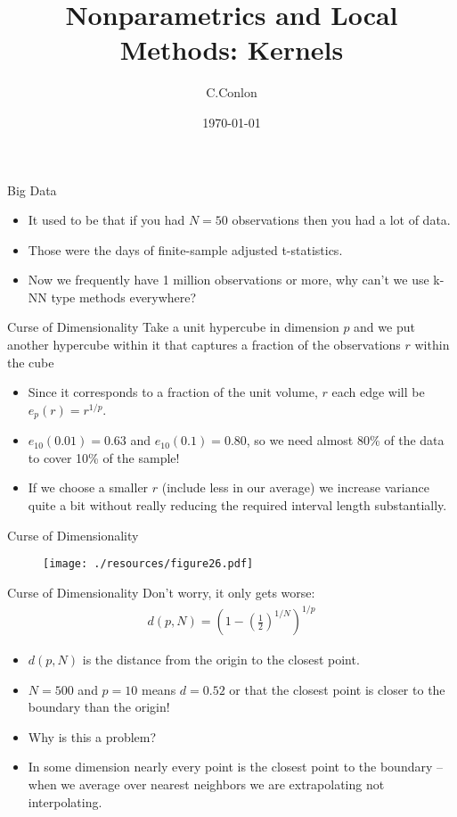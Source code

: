 \documentclass[11pt,handout,xcolor=pdftex,dvipsnames,table,mathserif,aspectratio=169]{beamer}
\title [Nonparametrics]{Nonparametrics and Local Methods: Kernels}
\author{C.Conlon}
\institute{Applied Econometrics}
\date{\today}
\begin{document}
\begin{frame}
\titlepage
\end{frame}



\begin{frame}{Big Data}
\begin{itemize}
\item It used to be that if you had $N=50$ observations then you had a lot of data.
\item Those were the days of finite-sample adjusted t-statistics.
\item Now we frequently have 1 million observations or more, why can't we use k-NN type methods everywhere?
\end{itemize}
\end{frame}

\begin{frame}{Curse of Dimensionality}
Take a unit hypercube in dimension $p$ and we put another hypercube within it that captures a fraction of the observations $r$ within the cube
\begin{itemize}
\item Since it corresponds to a fraction of the unit volume, $r$ each edge  will be $e_p(r) = r^{1/p}$.
\item $e_{10}(0.01) = 0.63$ and $e_{10}(0.1) = 0.80$, so we need almost 80\% of the data to cover 10\% of the sample!
\item If we choose a smaller $r$ (include less in our average) we increase variance quite a bit without really reducing the required interval length substantially.
\end{itemize}
\end{frame}

\begin{frame}{Curse of Dimensionality}
\begin{figure}[htbp]
\begin{center}
\texttt{[image: ./resources/figure26.pdf]}
\label{class15nn}
\end{center}
\end{figure}
\end{frame}

\begin{frame}{Curse of Dimensionality}
Don't worry, it only gets worse:
\begin{eqnarray*}
d(p,N) = \left(1-\left(\frac{1}{2} \right)^{1/N} \right)^{1/p}
\end{eqnarray*}

\begin{itemize}
\item $d(p,N)$ is the distance from the origin to the closest point.
\item $N=500$ and $p=10$ means $d = 0.52$ or that the closest point is closer to the boundary than the origin!
\item Why is this a problem?
\item In some dimension nearly every point is the closest point to the boundary -- when we average over nearest neighbors we are \alert{extrapolating} not \alert{interpolating}.
\end{itemize}
\end{frame}
\end{document}
